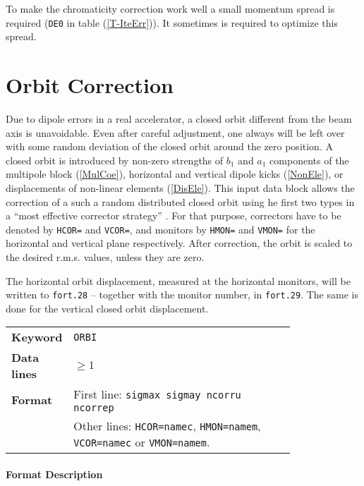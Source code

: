 To make the chromaticity correction work well a small momentum spread is required (\texttt{DE0} in table (\ref{T-IteErr})).
It sometimes is required to optimize this spread.

\section{Orbit Correction} \label{OrbCorr}

Due to dipole errors in a real accelerator, a closed orbit different from the beam axis is unavoidable.
Even after careful adjustment, one always will be left over with some random deviation of the closed orbit around the zero position.
A closed orbit is introduced by non-zero strengths of $b_{1}$ and $a_{1}$ components of the multipole block (\ref{MulCoe}), horizontal and vertical dipole kicks (\ref{NonEle}), or displacements of non-linear elements (\ref{DisEle}).
This input data block allows the correction of a such a random distributed closed orbit using he first two types in a ``most effective corrector strategy'' \cite{Auti}.
For that purpose, correctors have to be denoted by \texttt{HCOR=} and \texttt{VCOR=}, and monitors by \texttt{HMON=} and \texttt{VMON=} for the horizontal and vertical plane respectively.
After correction, the orbit is scaled to the desired r.m.s. values, unless they are zero.

The horizontal orbit displacement, measured at the horizontal monitors, will be written to \texttt{fort.28} -- together with the monitor number, in \texttt{fort.29}. The same is done for the vertical closed orbit displacement. 

\bigskip
\begin{tabular}{@{}lp{0.8\linewidth}}
    \textbf{Keyword}    & \texttt{ORBI} \\
    \textbf{Data lines} & $\geq 1$ \\
    \textbf{Format}     & First line: \texttt{sigmax sigmay ncorru ncorrep} \\
                        & Other lines: \texttt{HCOR=namec}, \texttt{HMON=namem}, \texttt{VCOR=namec} or \texttt{VMON=namem}.\\
\end{tabular}

\paragraph{Format Description}~

